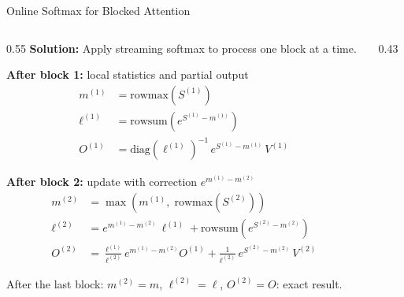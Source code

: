 \begin{frame}{Online Softmax for Blocked Attention}
  \begin{columns}[T]
    \begin{column}{0.55\textwidth}
      \textbf{Solution:} Apply streaming softmax to process one block at a time.

      \vspace{0.3em}
      {\small\textbf{After block 1:} local statistics and partial output}
      \vspace{-0.3em}
      \begin{align*}
        m^{(1)} &= \text{rowmax}(S^{(1)}) \\
        \ell^{(1)} &= \text{rowsum}(e^{S^{(1)} - m^{(1)}}) \\
        O^{(1)} &= \text{diag}(\ell^{(1)})^{-1}\, e^{S^{(1)} - m^{(1)}}\, V^{(1)}
      \end{align*}

      \vspace{-0.5em}
      {\small\textbf{After block 2:} update with correction $e^{m^{(1)} - m^{(2)}}$}
      \vspace{-0.3em}
      \begin{align*}
        m^{(2)} &= \max(m^{(1)},\; \text{rowmax}(S^{(2)})) \\
        \ell^{(2)} &= e^{m^{(1)} - m^{(2)}}\, \ell^{(1)} + \text{rowsum}(e^{S^{(2)} - m^{(2)}}) \\
        O^{(2)} &= \tfrac{\ell^{(1)}}{\ell^{(2)}} e^{m^{(1)}-m^{(2)}} O^{(1)}
                 + \tfrac{1}{\ell^{(2)}}\, e^{S^{(2)} - m^{(2)}}\, V^{(2)}
      \end{align*}

      \vspace{-0.3em}
      {\small After the last block: $m^{(2)} \!=\! m$, $\ell^{(2)} \!=\! \ell$, $O^{(2)} \!=\! O$: exact result.}
    \end{column}
    \begin{column}{0.43\textwidth}
      \centering
\end{column}
\end{columns}
\end{frame}
